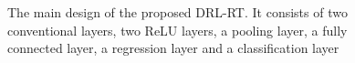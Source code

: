 \begin{intro}
\begin{figure}[!h]
	\caption{The main design of the proposed DRL-RT. It consists of two conventional layers, two ReLU layers, a pooling layer, a fully connected layer, a regression layer and a classification layer}
	\label{Fig:Deep_Reinf_Net}
\end{figure}
\end{intro}

